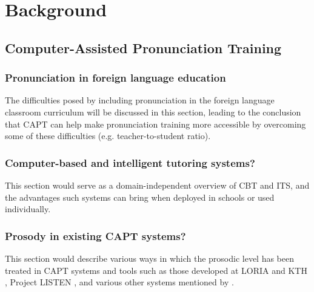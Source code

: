 %
%
\chapter{Background%
}
\label{chap:background}





\section{Computer-Assisted Pronunciation Training} %
\label{sec:bkgd:capt}

	\citep{Eskenazi2009,Delmonte2011,Witt2012}

	\subsection{Pronunciation in foreign language education}
	\label{sec:capt:l2ed}
	
	The difficulties posed by including pronunciation in the foreign language classroom curriculum will be discussed in this section, leading to the conclusion that CAPT can help make pronunciation training more accessible by overcoming some of these difficulties (e.g. teacher-to-student ratio).


	\subsection{Computer-based and intelligent tutoring systems?} 
	\label{sec:capt:its}
	
	This section would serve as a domain-independent overview of CBT and ITS, and the advantages such systems can bring when deployed in schools or used individually.
	
	\subsection{Prosody in existing CAPT systems?}
	\label{sec:capt:systems}
	
	This section would describe various ways in which the prosodic level has been treated in CAPT systems and tools such as those developed at LORIA \citep{Bonneau2011} and KTH \citep{Hincks2002,Hincks2009}, Project LISTEN \citep[e.g.]{Mostow2012}, and various other systems mentioned by \textcite{Eskenazi2009,Delmonte2011,Witt2012}.
	

